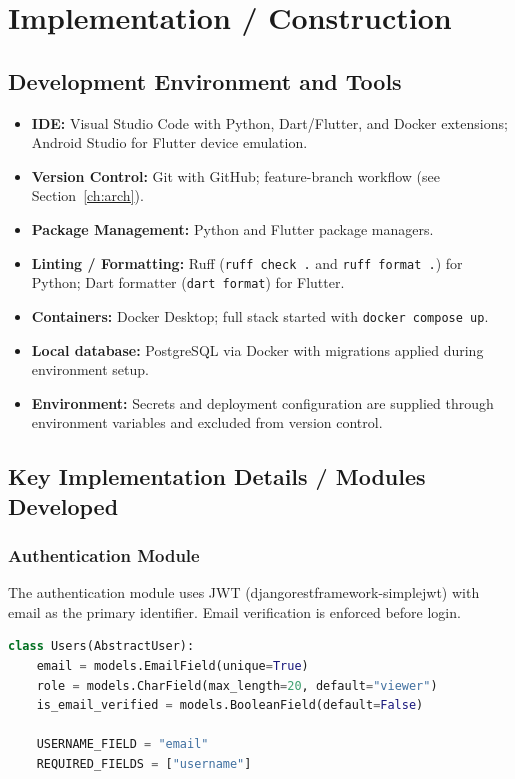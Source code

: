 \chapter{Implementation / Construction}\label{ch:impl}

\section{Development Environment and Tools}

\begin{itemize}
  \item \textbf{IDE:} Visual Studio Code with Python, Dart/Flutter, and Docker
        extensions; Android Studio for Flutter device emulation.
  \item \textbf{Version Control:} Git with GitHub; feature-branch workflow
        (see Section~\ref{ch:arch}).
  \item \textbf{Package Management:} Python and Flutter package managers.
  \item \textbf{Linting / Formatting:} Ruff (\texttt{ruff check .} and
        \texttt{ruff format .}) for Python; Dart formatter (\texttt{dart format})
        for Flutter.
  \item \textbf{Containers:} Docker Desktop; full stack started with
        \texttt{docker compose up}.
  \item \textbf{Local database:} PostgreSQL via Docker with migrations applied
        during environment setup.
  \item \textbf{Environment:} Secrets and deployment configuration are supplied
        through environment variables and excluded from version control.
\end{itemize}

\section{Key Implementation Details / Modules Developed}

\subsection{Authentication Module}

The authentication module uses JWT (djangorestframework-simplejwt) with email
as the primary identifier.  Email verification is enforced before login.

\begin{lstlisting}[language=Python,
  caption={Users model with email as the login identifier},
  label={lst:users}]
class Users(AbstractUser):
    email = models.EmailField(unique=True)
    role = models.CharField(max_length=20, default="viewer")
    is_email_verified = models.BooleanField(default=False)

    USERNAME_FIELD = "email"
    REQUIRED_FIELDS = ["username"]
\end{lstlisting}

